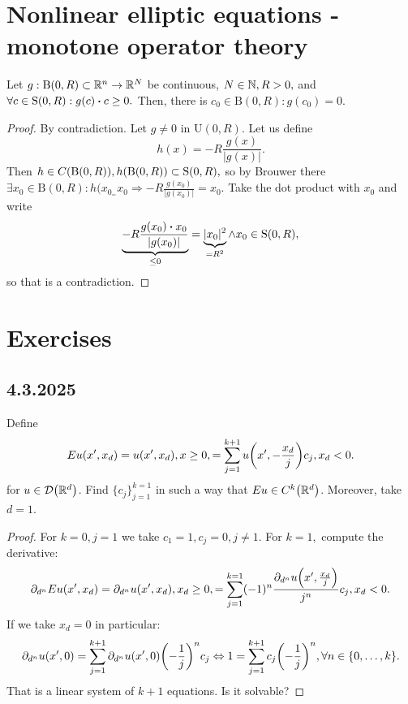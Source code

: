 \documentclass{article}
\begin{document}
\section{Nonlinear elliptic equations - monotone operator theory}
\label{sec:monotone_operator}

\begin{lemma}
    Let $g: \text{B}(0,R) \subset {\mathbb R}^n \to {\mathbb R}^N$ be continuous, $N \in {\mathbb N}, R>0,$ and $\forall c \in \text{S}(0,R): g(c) \vdot c \geq 0.$ Then, there is $c_0 \in \text{B}(0,R): g(c_0) = 0.$
    \begin{proof}
        By contradiction. Let $g \neq 0$ in $\text{U}(0,R)$. Let us define
	\[
		h(x) = -R\frac{g(x)}{|g(x)|}.
	\]
	Then $h \in C\qty(\text{B}(0,R)), h\qty(\text{B}(0,R)) \subset \text{S}(0,R),$ so by Brouwer there $\exists x_0 \in \text{B}(0,R): h(x_0_ = x_0 \Rightarrow -R \frac{g(x_0)}{|g(x_0)|} = x_0.$ Take the dot product with $x_0$ and write
	\[
		\underbrace{-R \frac{g(x_0) \vdot x_0}{|g(x_0)|}}_{\leq 0} = \underbrace{|x_0|^{2}}_{ = R^{2}} \wedge x_0 \in \text{S}(0,R),
	\]
	so that is a contradiction.
    \end{proof}
\end{lemma}
\section{Exercises}
\label{sec:exercises}

\subsection{4.3.2025}
\label{sec:43}

\begin{example}
Define
\[
	Eu(x',x_d) = u(x',x_d), x \geq 0, = \sum_{j=1}^{k+1}u\qty(x',-\frac{x_d}{j})c_j, x_d<0.
\]
for $u \in \mathcal{D}\qty({\mathbb R}^d)$. Find $\{c_j\}_{j=1}^{k=1}$ in such a way that $Eu \in C^k\qty({\mathbb R}^d)$. Moreover, take $d=1$.
\end{example}
\begin{proof}
 For $k=0, j=1$ we take $c_1=1, c_j=0, j \neq 1$. For $k=1,$ compute the derivative:
\[
	\partial_{d^n}E u(x',x_d) = \partial_{d^n}u(x',x_d), x_d \geq 0, =\sum_{j=1}^{k=1}(-1)^n\frac{\partial_{d^n}u\qty(x',\frac{x_d}{j})}{j^n}c_j, x_d <0.
\]
If we take $x_d=0$ in particular:
\[
	\partial_{d^n}u\qty(x',0)= \sum_{j=1}^{k+1}\partial_{d^n}u\qty(x',0)\qty(-\frac{1}{j})^n c_j \Leftrightarrow 1 = \sum_{j=1}^{k+1}c_j \qty(-\frac{1}{j})^n, \forall n \in \{0,\dots,k\}.
\]
  That is a linear system of $k+1$ equations. Is it solvable?
\end{proof}
\
\end{document}
